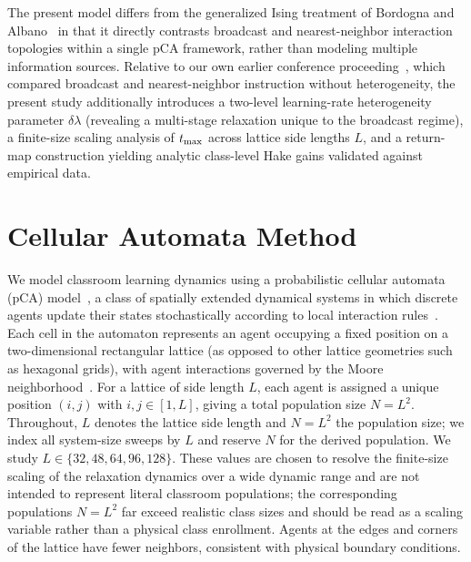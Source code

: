 \documentclass[a4paper,fleqn]{cas-sc}
\begin{document}
The present model differs from the generalized Ising treatment of Bordogna and Albano~\citep{bordogna2001theoretical, bordogna2003simulation} in that it directly contrasts broadcast and nearest-neighbor interaction topologies within a single pCA framework, rather than modeling multiple information sources. Relative to our own earlier conference proceeding~\citep{SelfSPP}, which compared broadcast and nearest-neighbor instruction without heterogeneity, the present study additionally introduces a two-level learning-rate heterogeneity parameter $\delta\lambda$ (revealing a multi-stage relaxation unique to the broadcast regime), a finite-size scaling analysis of $t_{\rm max}$ across lattice side lengths $L$, and a return-map construction yielding analytic class-level Hake gains validated against empirical data.

\section{Cellular Automata Method}\label{sec:methods}

We model classroom learning dynamics using a probabilistic cellular automata (pCA) model~\citep{SelfSPP}, a class of spatially extended dynamical systems in which discrete agents update their states stochastically according to local interaction rules~\citep{louis2018probabilistic, Fernandez2018}.
Each cell in the automaton represents an agent occupying a fixed position on a two-dimensional rectangular lattice (as opposed to other lattice geometries such as hexagonal grids), with agent interactions governed by the Moore neighborhood~\citep{kari2005catheory, zaitsev2017generalized}.
For a lattice of side length $L$, each agent is assigned a unique position $(i,j)$ with $i,j\in[1,L]$, giving a total population size $N=L^2$.
Throughout, $L$ denotes the lattice side length and $N=L^2$ the population size; we index all system-size sweeps by $L$ and reserve $N$ for the derived population. We study $L\in\{32,48,64,96,128\}$. These values are chosen to resolve the finite-size scaling of the relaxation dynamics over a wide dynamic range and are not intended to represent literal classroom populations; the corresponding populations $N=L^2$ far exceed realistic class sizes and should be read as a scaling variable rather than a physical class enrollment.
Agents at the edges and corners of the lattice have fewer neighbors, consistent with physical boundary conditions.
\end{document}
